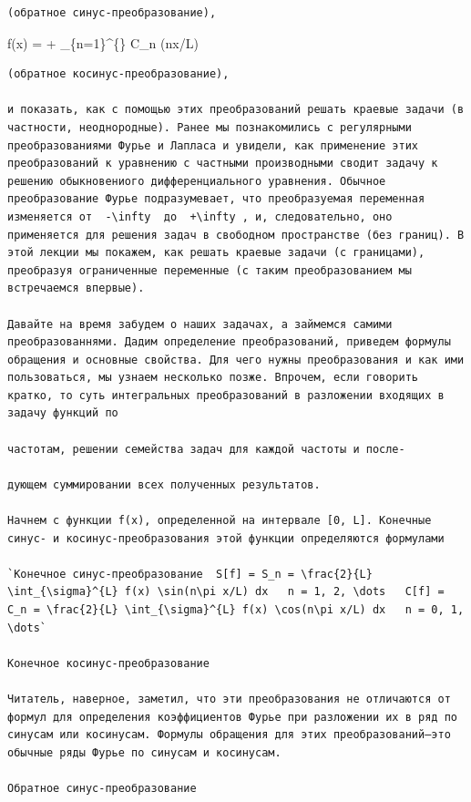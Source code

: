 \documentclass[
  ukrainian,
]{article}
\begin{document}
\begin{verbatim}
(обратное синус-преобразование),
\end{verbatim}

f(x) =  + \sum\_\{n=1\}\^{}\{\infty\} C\_n \cos(n\pi x/L)

\begin{verbatim}
(обратное косинус-преобразование),

и показать, как с помощью этих преобразований решать краевые задачи (в частности, неоднородные). Ранее мы познакомились с регулярными преобразованиями Фурье и Лапласа и увидели, как применение этих преобразований к уравнению с частными производными сводит задачу к решению обыкновениого дифференциального уравнения. Обычное преобразование Фурье подразумевает, что преобразуемая переменная изменяется от  -\infty  до  +\infty , и, следовательно, оно применяется для решения задач в свободном пространстве (без границ). В этой лекции мы покажем, как решать краевые задачи (с границами), преобразуя ограниченные переменные (с таким преобразованием мы встречаемся впервые).

Давайте на время забудем о наших задачах, а займемся самими преобразованнями. Дадим определение преобразований, приведем формулы обращения и основные свойства. Для чего нужны преобразования и как ими пользоваться, мы узнаем несколько позже. Впрочем, если говорить кратко, то суть интегральных преобразований в разложении входящих в задачу функций по

частотам, решении семейства задач для каждой частоты и после-

дующем суммировании всех полученных результатов.

Начнем с функции f(x), определенной на интервале [0, L]. Конечные синус- и косинус-преобразования этой функции определяются формулами

`Конечное синус-преобразование  S[f] = S_n = \frac{2}{L} \int_{\sigma}^{L} f(x) \sin(n\pi x/L) dx   n = 1, 2, \dots   C[f] = C_n = \frac{2}{L} \int_{\sigma}^{L} f(x) \cos(n\pi x/L) dx   n = 0, 1, \dots`

Конечное косинус-преобразование

Читатель, наверное, заметил, что эти преобразования не отличаются от формул для определения коэффициентов Фурье при разложении их в ряд по синусам или косинусам. Формулы обращения для этих преобразований—это обычные ряды Фурье по синусам и косинусам.

Обратное синус-преобразование
\end{verbatim}
\end{document}
